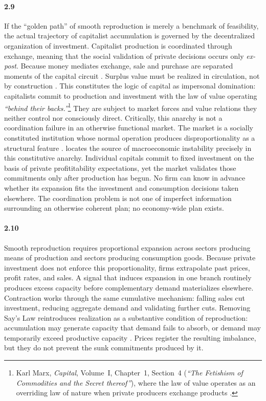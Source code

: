 \paragraph{2.9} If the ``golden path'' of smooth reproduction is merely a
benchmark of feasibility, the actual trajectory of capitalist
accumulation is governed by the decentralized organization of
investment. Capitalist production is coordinated through
exchange, meaning that the social validation of private
decisions occurs only \textit{ex-post}. Because money mediates
exchange, sale and purchase are separated moments of the capital
circuit \citep{Basu2022}. Surplus value must be realized in
circulation, not by construction \citep{Foley1985, Trigg2020}.
This constitutes the logic of capital as impersonal domination:
capitalists commit to production and investment with the law of
value operating \textit{``behind their backs.''}\footnote{Karl
	Marx, \textit{Capital}, Volume~I, Chapter~1, Section~4 (\textit{``The
	Fetishism of Commodities and the Secret thereof''}), where the
	law of value operates as an overriding law of nature when
	private producers exchange products \citep{MarxKVI}.} They are subject to market
forces and value relations they neither control nor consciously
direct. Critically, this anarchy is not a coordination failure
in an otherwise functional market. The market is a socially
constituted institution whose normal operation produces
disproportionality as a structural feature
\citep{VidalPeck2012}. \citet{Okishio2022} locates the source
of macroeconomic instability precisely in this constitutive
anarchy. Individual capitals commit to fixed investment on the
basis of private profititability expectations, yet the market validates
those commitments only after production has begun. No firm can
know in advance whether its expansion fits the investment and
consumption decisions taken elsewhere. The coordination problem
is not one of imperfect information surrounding an otherwise
coherent plan; no economy-wide plan exists.

\paragraph{2.10} Smooth reproduction requires proportional expansion across
sectors producing means of production and sectors producing
consumption goods. Because private investment does not enforce
this proportionality, firms extrapolate past prices, profit
rates, and sales. A signal that induces expansion in one branch
routinely produces excess capacity before complementary demand
materializes elsewhere. Contraction works through the same
cumulative mechanism: falling sales cut investment, reducing
aggregate demand and validating further cuts. Removing Say's
Law reintroduces realization as a substantive condition of
reproduction: accumulation may generate capacity that demand
fails to absorb, or demand may temporarily exceed productive
capacity \citep{Foley1985}. Prices register the
resulting imbalance, but they do not prevent the sunk
commitments produced by it.


